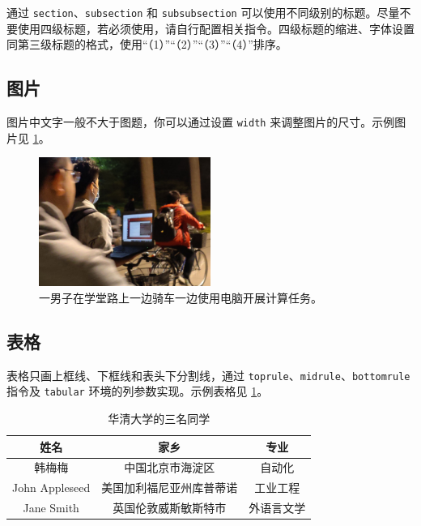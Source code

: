 \documentclass{wc-article}
\begin{document}
通过 \texttt{section}、\texttt{subsection} 和 \texttt{subsubsection} 可以使用不同级别的标题。尽量不要使用四级标题，若必须使用，请自行配置相关指令。四级标题的缩进、字体设置同第三级标题的格式，使用“（1）”“（2）”“（3）”“（4）”排序。

\subsection{图片}

图片中文字一般不大于图题，你可以通过设置 \texttt{width} 来调整图片的尺寸。示例图片见 \cref{fig:example-fig}。

\begin{figure}[H]
    \centering
    \includegraphics[width=0.5\textwidth]{assets/rider.jpg}
    \caption{一男子在学堂路上一边骑车一边使用电脑开展计算任务。}
    \label{fig:example-fig}
\end{figure}

\subsection{表格}

表格只画上框线、下框线和表头下分割线，通过 \texttt{toprule}、\texttt{midrule}、\texttt{bottomrule} 指令及 \texttt{tabular} 环境的列参数实现。示例表格见 \cref{tab:example-table}。

\begin{table}[H]
\begin{center}
    \caption{华清大学的三名同学}

    \begin{tabular}{c c c}
         \toprule
         \textbf{姓名} & \textbf{家乡} & \textbf{专业} \\
         \midrule
         韩梅梅 & 中国北京市海淀区 & 自动化 \\
         John Appleseed & 美国加利福尼亚州库普蒂诺 & 工业工程 \\
         Jane Smith & 英国伦敦威斯敏斯特市 & 外语言文学 \\
         \bottomrule
    \end{tabular}
\end{center}

    
    \label{tab:example-table}
\end{table}
\end{document}
